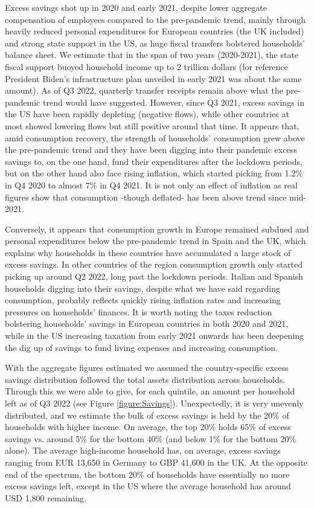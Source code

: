 Excess savings shot up in 2020 and early 2021, despite lower aggregate compensation of employees compared to the pre-pandemic trend, mainly through heavily reduced personal expenditures for European countries (the UK included) and strong state support in the US, as huge fiscal transfers bolstered households’ balance sheet. 
We estimate that in the span of two years (2020-2021), the state fiscal support buoyed household income up to 2 trillion dollars (for reference President Biden's infrastructure plan unveiled in early 2021 was about the same amount). 
As of Q3 2022, quarterly transfer receipts remain above what the pre-pandemic trend would have suggested. 
However, since Q3 2021, excess savings in the US have been rapidly depleting (negative flows), while other countries at most showed lowering flows but still positive around that time. 
It appears that, amid consumption recovery, the strength of households’ consumption grew above the pre-pandemic trend and they have been digging into their pandemic excess savings to, on the one hand, fund their expenditures after the lockdown periods, but on the other hand also face rising inflation, which started picking from 1.2\% in Q4 2020 to almost 7\% in Q4 2021. 
It is not only an effect of inflation as real figures show that consumption -though deflated- has been above trend since mid-2021. 

Conversely, it appears that consumption growth in Europe remained subdued and personal expenditures below the pre-pandemic trend in Spain and the UK, which explains why households in these countries have accumulated a large stock of excess savings. 
In other countries of the region consumption growth only started picking up around Q2 2022, long past the lockdown periods. Italian and Spanish households digging into their savings, despite what we have said regarding consumption, probably reflects quickly rising inflation rates and increasing pressures on households’ finances. 
It is worth noting the taxes reduction bolstering households’ savings in European countries in both 2020 and 2021, while in the US increasing taxation from early 2021 onwards has been deepening the dig up of savings to fund living expenses and increasing consumption.

With the aggregate figures estimated we assumed the country-specific excess savings distribution followed the total assets distribution across households. 
Through this we were able to give, for each quintile, an amount per household left as of Q3 2022 (see Figure \ref{figure:Savings}). 
Unexpectedly, it is very unevenly distributed, and we estimate the bulk of excess savings is held by the 20\% of households with higher income. 
On average, the top 20\% holds 65\% of excess savings vs. around 5\% for the bottom 40\% (and below 1\% for the bottom 20\% alone). 
The average high-income household has, on average, excess savings ranging from EUR 13,650 in Germany to GBP 41,600 in the UK. 
At the opposite end of the spectrum, the bottom 20\% of households have essentially no more excess savings left, except in the US where the average household has around USD 1,800 remaining. 

